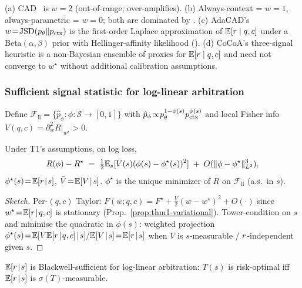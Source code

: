 \begin{corollary}
\label{cor:special-cases}
\textup{(a)} CAD~\citep{shi2024cad} is $w\!=\!2$ (out-of-range; over-amplifies).
\textup{(b)} Always-context = $w\!=\!1$, always-parametric = $w\!=\!0$;
both are dominated by .
\textup{(c)} AdaCAD's $w\!=\!\operatorname{JSD}(p_\theta\|p_{\mathrm{ctx}})$ is the first-order
Laplace approximation of $\mathbb{E}[r\mid q,c]$ under a Beta$(\alpha,\beta)$ prior
with Hellinger-affinity likelihood ().
\textup{(d)} CoCoA's three-signal heuristic is a non-Bayesian ensemble of
proxies for $\mathbb{E}[r\mid q,c]$ and need not converge to $w^\star$ without
additional calibration assumptions.
\end{corollary}

\subsubsection{Sufficient signal statistic for log-linear arbitration}
\label{app:thm1-strengthenings}

Define $\mathcal{F}_{\mathrm{ll}}\!=\!\{\hat p_\phi\!:\!\phi\!:\!\mathcal{S}\!\to\![0,1]\}$
with $\hat p_\phi\!\propto\!p_\theta^{1-\phi(s)}p_{\mathrm{ctx}}^{\phi(s)}$ and
local Fisher info $V(q,c)\!=\!\partial^2_w R|_{w^\star}\!>\!0$.

\begin{theorem}
\label{thm:t1-sufficient}
Under T1's assumptions, on log loss,
\begin{equation}
R(\phi)-R^\star\;=\;\tfrac12\mathbb{E}_s[\bar V(s)(\phi(s)-\phi^\star(s))^2]\;+\;O(\|\phi-\phi^\star\|_{L^3}^3),
\label{eq:t1-suff-quadratic}
\end{equation}
$\phi^\star(s)\!=\!\mathbb{E}[r\!\mid\!s]$, $\bar V\!=\!\mathbb{E}[V\!\mid\!s]$.
$\phi^\star$ is the unique minimizer of $R$ on $\mathcal{F}_{\mathrm{ll}}$
(a.s.\ in $s$).
\end{theorem}

\begin{proof}[Sketch]
Per-$(q,c)$ Taylor: $F(w;q,c)\!=\!F^\star\!+\!\tfrac{V}{2}(w-w^\star)^2\!+\!O(\cdot)$
since $w^\star\!=\!\mathbb{E}[r\!\mid\!q,c]$ is stationary
(Prop.~\ref{prop:thm1-variational}).  Tower-condition on $s$ and
minimise the quadratic in $\phi(s)$: weighted projection
$\phi^\star(s)\!=\!\E[V\E[\reli\!\mid\!q,c]\!\mid\!s]/\E[V\!\mid\!s]\!=\!\E[\reli\!\mid\!s]$
when $V$ is $s$-measurable / $r$-independent given $s$.
\end{proof}

\begin{corollary}
\label{cor:t1-sufficient}
$\mathbb{E}[r\!\mid\!s]$ is Blackwell-sufficient for log-linear
arbitration: $T(s)$ is risk-optimal iff $\mathbb{E}[r\!\mid\!s]$ is
$\sigma(T)$-measurable.
\end{corollary}

